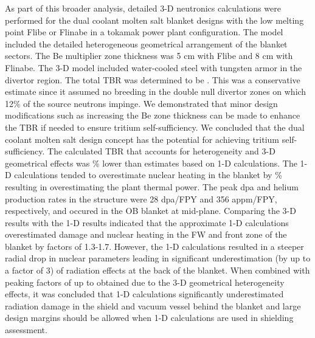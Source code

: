 As part of this broader analysis, detailed 3-D neutronics calculations were
performed for the dual coolant molten salt blanket designs with the low
melting point Flibe or Flinabe in a tokamak power plant configuration. The
model included the detailed heterogeneous geometrical arrangement of the
blanket sectors. The Be multiplier zone thickness was 5 cm with Flibe and 8 cm
with Flinabe. The 3-D model included water-cooled steel with tungsten armor in
the divertor region. The total TBR was determined to be .
This was a conservative estimate since it assumed no breeding in the double
null divertor zones on which 12\% of the source neutrons impinge. We
demonstrated that minor design modifications such as increasing the Be zone
thickness can be made to enhance the \gls{TBR} if needed to ensure tritium
self-sufficiency. We concluded that the dual coolant molten salt design
concept has the potential for achieving tritium self-sufficiency. The
calculated \gls{TBR} that accounts for heterogeneity and 3-D geometrical
effects was \% lower than estimates based on 1-D
calculations. The 1-D calculations tended to overestimate nuclear heating in
the blanket by \% resulting in overestimating the plant thermal
power. The peak dpa and helium production rates in the structure were 28
dpa/FPY and 356 appm/FPY, respectively, and occured in the \gls{OB} blanket at
mid-plane. Comparing the 3-D results with the 1-D results indicated that the
approximate 1-D calculations overestimated damage and nuclear heating in the
\gls{FW} and front zone of the blanket by factors of 1.3-1.7. However, the 1-D
calculations resulted in a steeper radial drop in nuclear parameters leading
in significant underestimation (by up to a factor of 3) of radiation effects
at the back of the blanket. When combined with peaking factors of up to
 obtained due to the 3-D geometrical heterogeneity effects, it
was concluded that 1-D calculations significantly underestimated radiation
damage in the shield and vacuum vessel behind the blanket and large design
margins should be allowed when 1-D calculations are used in shielding
assessment.

